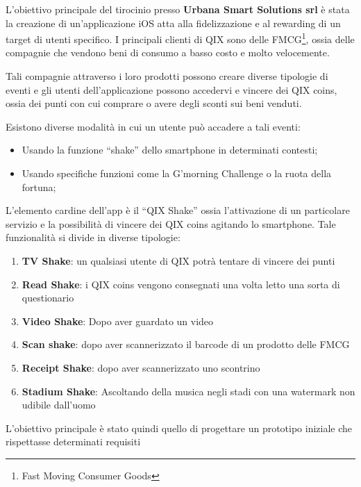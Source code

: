\normalsize
L’obiettivo principale del tirocinio presso \textbf{Urbana Smart Solutions srl}\cite{urbanasmartsolutions} è stata la creazione di un'applicazione iOS atta alla fidelizzazione e al rewarding di un target di utenti specifico. I principali clienti di QIX sono delle FMCG\footnote{Fast Moving Consumer Goods}, ossia delle compagnie che vendono beni di consumo a basso costo e molto velocemente.

Tali compagnie attraverso i loro prodotti possono creare diverse tipologie di eventi e gli utenti dell’applicazione possono accedervi e vincere dei QIX coins, ossia dei punti con cui comprare o avere degli sconti sui beni venduti.

Esistono diverse modalità in cui un utente può accadere a tali eventi:
\begin{itemize}
    \item Usando la funzione “shake” dello smartphone in determinati contesti;
    \item Usando specifiche funzioni come la G'morning Challenge o la ruota della fortuna;
\end{itemize}

L’elemento cardine dell’app è il “QIX Shake” ossia l’attivazione di un particolare servizio e la possibilità di vincere dei QIX coins agitando lo smartphone. Tale funzionalità si divide in diverse tipologie:

\begin{enumerate}
    \item\textbf{TV Shake}: un qualsiasi utente di QIX potrà tentare di vincere dei punti
    \item\textbf{Read Shake}: i QIX coins vengono consegnati una volta letto una sorta di questionario
    \item\textbf{Video Shake}: Dopo aver guardato un video
    \item\textbf{Scan shake}: dopo aver scannerizzato il barcode di un prodotto delle FMCG
    \item\textbf{Receipt Shake}: dopo aver scannerizzato uno scontrino
    \item\textbf{Stadium Shake}: Ascoltando della musica negli stadi con una watermark non udibile dall'uomo
\end{enumerate}

L'obiettivo principale è stato quindi quello di progettare
un prototipo iniziale che rispettasse determinati requisiti

